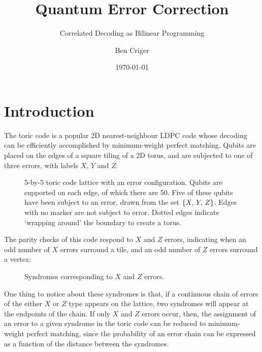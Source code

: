 \documentclass[a4paper, english]{scrartcl}
\title{Quantum Error Correction}
\subtitle{Correlated Decoding as Bilinear Programming}
\author{Ben Criger}
\date{\today}
\begin{document}
\maketitle
\section{Introduction}
The toric code is a popular 2D nearest-neighbour LDPC code whose decoding can be efficiently accomplished by minimum-weight perfect matching. 
Qubits are placed on the edges of a square tiling of a 2D torus, and are subjected to one of three errors, with labels $X$, $Y$ and $Z$:
\begin{figure}[!h]
\centering
{}
\caption{5-by-5 toric code lattice with an error configuration.
Qubits are supported on each edge, of which there are 50.
Five of these qubits have been subject to an error, drawn from the set $\left \lbrace X,\,Y,\,Z \right \rbrace$. 
Edges with no marker are not subject to error. 
Dotted edges indicate `wrapping around' the boundary to create a torus.}
\end{figure}

The parity checks of this code respond to $X$ and $Z$ errors, indicating when an odd number of $X$ errors surround a tile, and an odd number of $Z$ errors surround a vertex:
\begin{figure}[!h]
\centering
{}
\caption{Syndromes corresponding to $X$ and $Z$ errors.}
\end{figure}
\FloatBarrier
One thing to notice about these syndromes is that, if a continuous chain of errors of the either $X$ or $Z$ type appears on the lattice, two syndromes will appear at the endpoints of the chain.
If only $X$ and $Z$ errors occur, then, the assignment of an error to a given syndrome in the toric code can be reduced to minimum-weight perfect matching, since the probability of an error chain can be expressed as a function of the distance between the syndromes.
\end{document}
